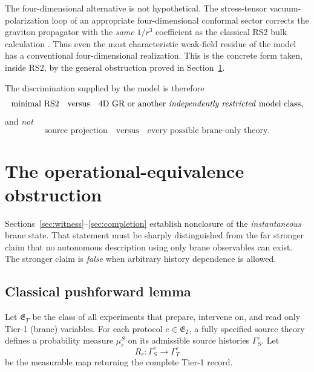 \documentclass[11pt,a4paper]{article}
\theoremstyle{plain}
\theoremstyle{definition}
\begin{document}
The four-dimensional alternative is not hypothetical. The stress-tensor
vacuum-polarization loop of an appropriate four-dimensional conformal
sector corrects the graviton propagator with the \emph{same} $1/r^3$
coefficient as the classical RS2 bulk calculation \cite{DuffLiu,APR,PerezVictoria}.
Thus even the most characteristic weak-field residue of the model has a
conventional four-dimensional realization. This is the concrete form
taken, inside RS2, by the general obstruction proved in
Section~\ref{sec:opeq}.

The discrimination supplied by the model is therefore
\begin{equation}
\label{eq:discrim}
\text{minimal RS2}
\quad\text{versus}\quad
\text{4D GR or another \emph{independently restricted} model class},
\end{equation}
and \emph{not}
\begin{equation}
\label{eq:notdiscrim}
\text{source projection}
\quad\text{versus}\quad
\text{every possible brane-only theory}.
\end{equation}

\section{The operational-equivalence obstruction}
\label{sec:opeq}

Sections~\ref{sec:witness}--\ref{sec:completion} establish nonclosure of
the \emph{instantaneous} brane state. That statement must be sharply
distinguished from the far stronger claim that no autonomous description
using only brane observables can exist. The stronger claim is
\emph{false} when arbitrary history dependence is allowed.

\subsection{Classical pushforward lemma}

Let $\mathfrak E_T$ be the class of all experiments that prepare,
intervene on, and read only Tier-1 (brane) variables. For each protocol
$e\in\mathfrak E_T$, a fully specified source theory defines a
probability measure $\mu^S_e$ on its admissible source histories
$\Gamma^e_S$. Let
\begin{equation}
\label{eq:Re}
R_e:\Gamma^e_S\longrightarrow\Gamma^e_T
\end{equation}
be the measurable map returning the complete Tier-1 record.
\end{document}
